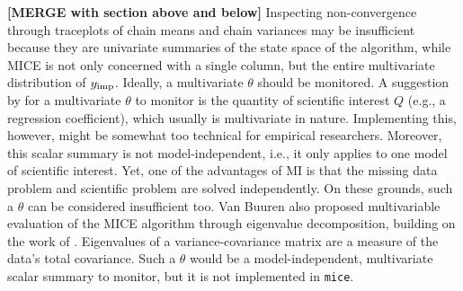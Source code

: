 \documentclass[Royal,times,sageh]{sagej}
\begin{document}
\textbf{{[}MERGE with section above and below{]}} Inspecting non-convergence through traceplots of chain means and chain variances may be insufficient because they are univariate summaries of the state space of the algorithm, while MICE is not only concerned with a single column, but the entire multivariate distribution of \(y_{\rm imp}\). Ideally, a multivariate \(\theta\) should be monitored. A suggestion by \citet{buur18} for a multivariate \(\theta\) to monitor is the quantity of scientific interest \(Q\) (e.g., a regression coefficient), which usually is multivariate in nature. Implementing this, however, might be somewhat too technical for empirical researchers. Moreover, this scalar summary is not model-independent, i.e., it only applies to one model of scientific interest. Yet, one of the advantages of MI is that the missing data problem and scientific problem are solved independently. On these grounds, such a \(\theta\) can be considered insufficient too. Van Buuren \citeyearpar[\(\S\) 4.5.2]{buur18} also proposed multivariable evaluation of the MICE algorithm through eigenvalue decomposition, building on the work of \citet{mack03}. Eigenvalues of a variance-covariance matrix are a measure of the data's total covariance. Such a \(\theta\) would be a model-independent, multivariate scalar summary to monitor, but it is not implemented in \texttt{mice}.
\end{document}
